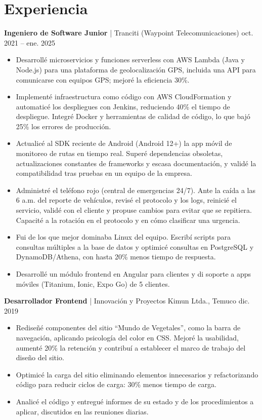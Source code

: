 \documentclass[10pt,letterpaper]{article}
\newcommand{\cvjob}[3]{%
  \vspace{5pt}%
  \textbf{#1} | #2 \hfill #3\par\vspace{1pt}}
\begin{document}
\section{Experiencia}

\cvjob{Ingeniero de Software Junior}{Tranciti (Waypoint Telecomunicaciones)}{oct. 2021 -- ene. 2025}
\begin{itemize}
  \item Desarrollé microservicios y funciones serverless con AWS Lambda (Java y Node.js) para una plataforma de geolocalización GPS, incluida una API para comunicarse con equipos GPS; mejoré la eficiencia 30\%.
  \item Implementé infraestructura como código con AWS CloudFormation y automaticé los despliegues con Jenkins, reduciendo 40\% el tiempo de despliegue. Integré Docker y herramientas de calidad de código, lo que bajó 25\% los errores de producción.
  \item Actualicé al SDK reciente de Android (Android 12+) la app móvil de monitoreo de rutas en tiempo real. Superé dependencias obsoletas, actualizaciones constantes de frameworks y escasa documentación, y validé la compatibilidad tras pruebas en un equipo de la empresa.
  \item Administré el teléfono rojo (central de emergencias 24/7). Ante la caída a las 6 a.m. del reporte de vehículos, revisé el protocolo y los logs, reinicié el servicio, validé con el cliente y propuse cambios para evitar que se repitiera. Capacité a la rotación en el protocolo y en cómo clasificar una urgencia.
  \item Fui de los que mejor dominaba Linux del equipo. Escribí scripts para consultas múltiples a la base de datos y optimicé consultas en PostgreSQL y DynamoDB/Athena, con hasta 20\% menos tiempo de respuesta.
  \item Desarrollé un módulo frontend en Angular para clientes y di soporte a apps móviles (Titanium, Ionic, Expo Go) de 5 clientes.
\end{itemize}

\cvjob{Desarrollador Frontend}{Innovación y Proyectos Kimun Ltda., Temuco}{dic. 2019}
\begin{itemize}
  \item Rediseñé componentes del sitio ``Mundo de Vegetales'', como la barra de navegación, aplicando psicología del color en CSS. Mejoré la usabilidad, aumenté 20\% la retención y contribuí a establecer el marco de trabajo del diseño del sitio.
  \item Optimicé la carga del sitio eliminando elementos innecesarios y refactorizando código para reducir ciclos de carga: 30\% menos tiempo de carga.
  \item Analicé el código y entregué informes de su estado y de los procedimientos a aplicar, discutidos en las reuniones diarias.
\end{itemize}
\end{document}
